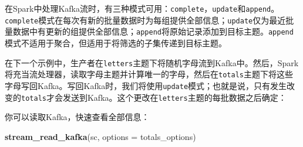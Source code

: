 \documentclass[
]{article}
\newenvironment{Shaded}{\begin{snugshade}}{\end{snugshade}}
\newcommand{\CommentTok}[1]{\textcolor[rgb]{0.56,0.35,0.01}{\textit{#1}}}
\newcommand{\DataTypeTok}[1]{\textcolor[rgb]{0.13,0.29,0.53}{#1}}
\newcommand{\KeywordTok}[1]{\textcolor[rgb]{0.13,0.29,0.53}{\textbf{#1}}}
\newcommand{\NormalTok}[1]{#1}
\newcommand{\OperatorTok}[1]{\textcolor[rgb]{0.81,0.36,0.00}{\textbf{#1}}}
\newcommand{\StringTok}[1]{\textcolor[rgb]{0.31,0.60,0.02}{#1}}
\begin{document}
在Spark中处理Kafka流时，有三种模式可用：\texttt{complete}，\texttt{update}和\texttt{append}。\texttt{complete}模式在每次有新的批量数据时为每组提供全部信息；\texttt{update}仅为最近批量数据中有更新的组提供全部信息；\texttt{append}将原始记录添加到目标主题。\texttt{append}模式不适用于聚合，但适用于将筛选的子集传递到目标主题。

在下一个示例中，生产者在\texttt{letters}主题下将随机字母流到Kafka中。然后，Spark将充当流处理器，读取字母主题并计算唯一的字母，然后在\texttt{totals}主题下将这些字母写回Kafka。写回Kafka时，我们将使用\texttt{update}模式；也就是说，只有发生改变的\texttt{totals}才会发送到Kafka。这个更改在\texttt{letters}主题的每批数据之后确定：

\begin{Shaded}
\end{Shaded}

你可以读取Kafka，快速查看全部信息：

\begin{Shaded}
\begin{Highlighting}[]
\KeywordTok{stream_read_kafka}\NormalTok{(sc, }\DataTypeTok{options =}\NormalTok{ totals_options)}
\end{Highlighting}
\end{Shaded}
\end{document}
